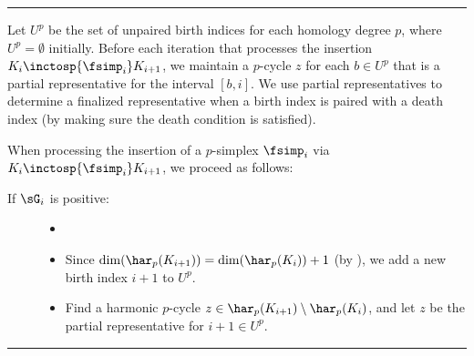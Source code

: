 \makeatletter
  \def\vhrulefill#1{\leavevmode\leaders\hrule\@height#1\hfill \kern\z@}
\makeatother

\newenvironment{algrl}
    {\vspace{5pt}
\par\nobreak\nobreak\noindent\vhrulefill{0.8pt}
\begin{algr}
\vspace{-5pt}
    }
    { 
\vspace{-3pt}    
\par\nobreak\nobreak\noindent\vhrulefill{0.8pt}
\end{algr}
\vspace{3pt}
    }

\begin{algrl}\label{alg:frame}
Let $U^p$ be the set of unpaired birth indices for each homology degree $p$, where $U^p=\emptyset$ initially. Before each iteration that processes the insertion $K_{i}\inctosp{\fsimp_i}K_{i+1}$, we maintain a $p$-cycle $z$ for each $b\in U^p$ that is a partial representative for the interval $[b,i]$.
We use partial representatives to determine a finalized representative when a birth index is paired with a death index (by making sure the death condition is satisfied).

When processing the insertion of a $p$-simplex $\fsimp_i$ via $K_{i}\inctosp{\fsimp_i}K_{i+1}$, we proceed as follows:
\begin{description}
    \item[If $\sG_i$ is positive:] 
    \begin{itemize}
        \item[]
        \item Since $\dim(\har_p(K_{i+1}))=\dim(\har_p(K_{i}))+1$ (by ), we add a new birth index $i+1$ to $U^{p}$.
        \item Find a harmonic $p$-cycle $z\in\har_p(K_{i+1})\setminus\har_p(K_{i})$, and let $z$ be the partial representative for $i+1\in U^p$.
    \end{itemize}
    

\end{description}
\end{algrl}
